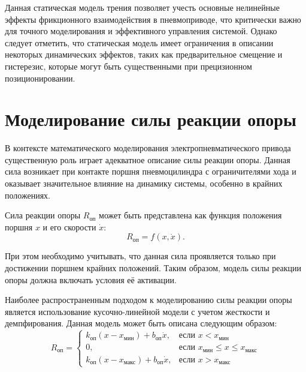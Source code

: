 Данная статическая модель трения позволяет учесть основные нелинейные
эффекты фрикционного взаимодействия в пневмоприводе, что критически важно для
точного моделирования и эффективного управления системой. Однако следует отметить, что
статическая модель имеет ограничения в описании некоторых динамических эффектов, таких
как предварительное смещение и гистерезис, которые могут быть
существенными при прецизионном позиционировании.


\section{Моделирование силы реакции опоры}\label{sec:ch2/sec2/subsec5}

В контексте математического моделирования электропневматического привода существенную роль играет
адекватное описание силы реакции опоры. Данная сила возникает при контакте поршня пневмоцилиндра
с ограничителями хода и оказывает значительное влияние на динамику системы, особенно в крайних положениях.

Сила реакции опоры $R_\text{оп}$ может быть представлена как функция положения поршня $x$ и его скорости $\dot{x}$:
\begin{equation*}
    R_\text{оп} = f(x, \dot{x}).
\end{equation*}

При этом необходимо учитывать, что данная сила проявляется только при достижении
поршнем крайних положений. Таким образом, модель силы реакции опоры должна включать
условия её активации.

Наиболее распространенным подходом к моделированию силы реакции опоры является использование кусочно-линейной модели с учетом жесткости и демпфирования. Данная модель может быть описана следующим образом:
\begin{equation}\label{eq:ch2/support_reaction}
    R_\text{оп} = \begin{cases}
        k_\text{оп}(x - x_\text{мин}) + b_\text{оп}\dot{x},  & \text{если } x < x_\text{мин}                       \\
        0,                                                   & \text{если } x_\text{мин} \leq x \leq x_\text{макс} \\
        k_\text{оп}(x - x_\text{макс}) + b_\text{оп}\dot{x}, & \text{если } x > x_\text{макс}
    \end{cases}
\end{equation}


